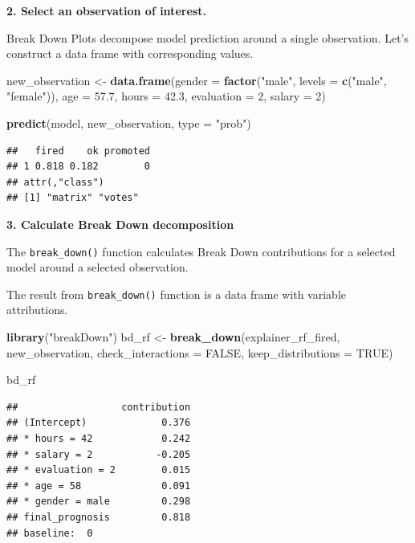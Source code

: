 \documentclass[]{krantz}
\newenvironment{Shaded}{\begin{snugshade}}{\end{snugshade}}
\newcommand{\DataTypeTok}[1]{\textcolor[rgb]{0.13,0.29,0.53}{#1}}
\newcommand{\DecValTok}[1]{\textcolor[rgb]{0.00,0.00,0.81}{#1}}
\newcommand{\FloatTok}[1]{\textcolor[rgb]{0.00,0.00,0.81}{#1}}
\newcommand{\KeywordTok}[1]{\textcolor[rgb]{0.13,0.29,0.53}{\textbf{#1}}}
\newcommand{\NormalTok}[1]{#1}
\newcommand{\OtherTok}[1]{\textcolor[rgb]{0.56,0.35,0.01}{#1}}
\newcommand{\StringTok}[1]{\textcolor[rgb]{0.31,0.60,0.02}{#1}}
\theoremstyle{definition}
\theoremstyle{definition}
\theoremstyle{definition}
\theoremstyle{remark}
\begin{document}
\textbf{2. Select an observation of interest.}

Break Down Plots decompose model prediction around a single observation.
Let's construct a data frame with corresponding values.

\begin{Shaded}
\begin{Highlighting}[]
\NormalTok{new_observation <-}\StringTok{ }\KeywordTok{data.frame}\NormalTok{(}\DataTypeTok{gender =} \KeywordTok{factor}\NormalTok{(}\StringTok{"male"}\NormalTok{, }\DataTypeTok{levels =} \KeywordTok{c}\NormalTok{(}\StringTok{"male"}\NormalTok{, }\StringTok{"female"}\NormalTok{)),}
                      \DataTypeTok{age =} \FloatTok{57.7}\NormalTok{,}
                      \DataTypeTok{hours =} \FloatTok{42.3}\NormalTok{,}
                      \DataTypeTok{evaluation =} \DecValTok{2}\NormalTok{,}
                      \DataTypeTok{salary =} \DecValTok{2}\NormalTok{)}

\KeywordTok{predict}\NormalTok{(model, new_observation, }\DataTypeTok{type =} \StringTok{"prob"}\NormalTok{)}
\end{Highlighting}
\end{Shaded}

\begin{verbatim}
##   fired    ok promoted
## 1 0.818 0.182        0
## attr(,"class")
## [1] "matrix" "votes"
\end{verbatim}

\textbf{3. Calculate Break Down decomposition}

The \texttt{break\_down()} function calculates Break Down contributions
for a selected model around a selected observation.

The result from \texttt{break\_down()} function is a data frame with
variable attributions.

\begin{Shaded}
\begin{Highlighting}[]
\KeywordTok{library}\NormalTok{(}\StringTok{"breakDown"}\NormalTok{)}
\NormalTok{bd_rf <-}\StringTok{ }\KeywordTok{break_down}\NormalTok{(explainer_rf_fired,}
\NormalTok{                 new_observation,}
                 \DataTypeTok{check_interactions =} \OtherTok{FALSE}\NormalTok{,}
                 \DataTypeTok{keep_distributions =} \OtherTok{TRUE}\NormalTok{)}

\NormalTok{bd_rf}
\end{Highlighting}
\end{Shaded}

\begin{verbatim}
##                  contribution
## (Intercept)             0.376
## * hours = 42            0.242
## * salary = 2           -0.205
## * evaluation = 2        0.015
## * age = 58              0.091
## * gender = male         0.298
## final_prognosis         0.818
## baseline:  0
\end{verbatim}
\end{document}

